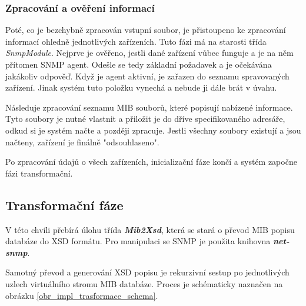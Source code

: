 \subsubsection*{Zpracování a ověření informací}
Poté, co je bezchybně zpracován vstupní soubor, je přistoupeno ke zpracování informací ohledně jednotlivých zařízeních. Tuto fázi má
na starosti třída \textit{SnmpModule}. Nejprve je ověřeno, jestli dané zařízení vůbec funguje a je na něm přítomen SNMP agent. Odešle
se tedy základní požadavek a je očekávána jakákoliv odpověď. Když je agent aktivní, je zařazen do seznamu spravovaných zařízení. Jinak
systém tuto položku vynechá a nebude ji dále brát v úvahu. 

Následuje zpracování seznamu MIB souborů, které popisují nabízené informace. Tyto soubory je nutné vlastnit a přiložit je do dříve specifikovaného
adresáře, odkud si je systém načte a později zpracuje. Jestli všechny soubory existují a jsou načteny, zařízení je finálně "odsouhlaseno".


Po zpracování údajů o všech zařízeních, inicializační fáze končí a systém započne fázi transformační.

\subsection{Transformační fáze}
V této chvíli přebírá úlohu třída \textit{\textbf{Mib2Xsd}}, která se stará o převod MIB popisu databáze do XSD formátu. Pro manipulaci se SNMP je
použita knihovna \textit{\textbf{net-snmp}}. %

Samotný převod a generování XSD popisu je rekurzivní sestup po jednotlivých uzlech virtuálního stromu MIB databáze. Proces je schématicky naznačen
na obrázku \ref{obr_impl_trasformace_schema}.

